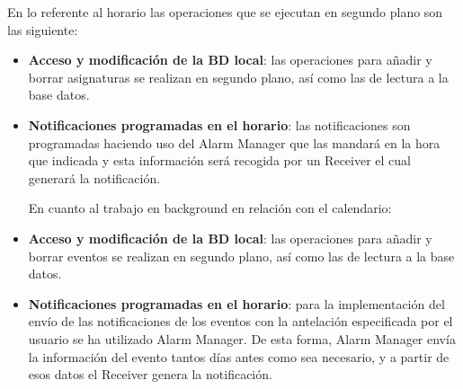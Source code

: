 \documentclass[a4paper,openright,12pt]{article}
\begin{document}
En lo referente al horario las operaciones que se ejecutan en segundo plano son las siguiente:
\begin{itemize}
\item \textbf{Acceso y modificación de la BD local}: las operaciones para añadir y borrar asignaturas se realizan en segundo plano, así como las de lectura a la base datos. 
\item \textbf{Notificaciones programadas en el horario}: las notificaciones son programadas haciendo uso del Alarm Manager que las mandará en la hora que indicada y esta información será recogida por un Receiver el cual generará la notificación.

En cuanto al trabajo en background en relación con el calendario:

\item \textbf{Acceso y modificación de la BD local}: las operaciones para añadir y borrar eventos se realizan en segundo plano, así como las de lectura a la base datos.

\item \textbf{Notificaciones programadas en el horario}: para la implementación del envío de las notificaciones de los eventos con la antelación especificada por el usuario se ha utilizado Alarm Manager. De esta forma, Alarm Manager envía la información del evento tantos días antes como sea necesario, y a partir de esos datos el Receiver genera la notificación.
\end{itemize}
\end{document}
